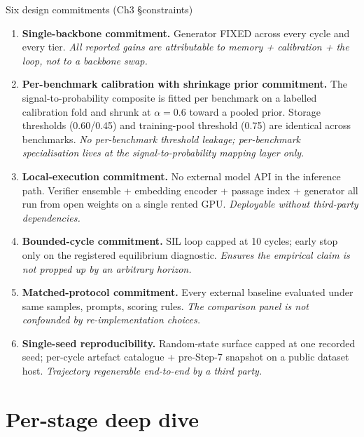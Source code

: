 \documentclass[10pt,aspectratio=169]{beamer}
\begin{document}
\begin{frame}{Six design commitments (Ch3 \S constraints)}
  \scriptsize
  \begin{enumerate}
    \item \textbf{Single-backbone commitment.} Generator FIXED across every cycle and every tier. \emph{All reported gains are attributable to memory + calibration + the loop, not to a backbone swap.}
    \item \textbf{Per-benchmark calibration with shrinkage prior commitment.} The signal-to-probability composite is fitted per benchmark on a labelled calibration fold and shrunk at $\alpha{=}0.6$ toward a pooled prior. Storage thresholds (0.60/0.45) and training-pool threshold (0.75) are identical across benchmarks. \emph{No per-benchmark threshold leakage; per-benchmark specialisation lives at the signal-to-probability mapping layer only.}
    \item \textbf{Local-execution commitment.} No external model API in the inference path. Verifier ensemble + embedding encoder + passage index + generator all run from open weights on a single rented GPU. \emph{Deployable without third-party dependencies.}
    \item \textbf{Bounded-cycle commitment.} SIL loop capped at 10 cycles; early stop only on the registered equilibrium diagnostic. \emph{Ensures the empirical claim is not propped up by an arbitrary horizon.}
    \item \textbf{Matched-protocol commitment.} Every external baseline evaluated under same samples, prompts, scoring rules. \emph{The comparison panel is not confounded by re-implementation choices.}
    \item \textbf{Single-seed reproducibility.} Random-state surface capped at one recorded seed; per-cycle artefact catalogue + pre-Step-7 snapshot on a public dataset host. \emph{Trajectory regenerable end-to-end by a third party.}
  \end{enumerate}
\end{frame}

\section*{Per-stage deep dive}
\end{document}

